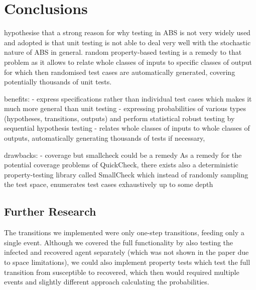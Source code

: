 \section{Conclusions}
\label{sec:conclusions}
hypothesise that a strong reason for why testing in ABS is not very widely used and adopted is that unit testing is not able to deal very well with the stochastic nature of ABS in general. random property-based testing is a remedy to that problem as it allows to relate whole classes of inputs to specific classes of output for which then randomised test cases are automatically generated, covering potentially thousands of unit tests.

benefits:
- express specifications rather than individual test cases which makes it much more general than unit testing
- expressing probabilities of various types (hypotheses, transitions, outputs) and perform statistical robust testing by sequential hypothesis testing
- relates whole classes of inputs to whole classes of outputs, automatically generating thousands of tests if necessary, 

drawbacks:
- coverage but smallcheck could be a remedy
As a remedy for the potential coverage problems of QuickCheck, there exists also a deterministic property-testing library called SmallCheck \cite{runciman_smallcheck_2008} which instead of randomly sampling the test space, enumerates test cases exhaustively up to some depth

\subsection{Further Research}
The transitions we implemented were only one-step transitions, feeding only a single event. Although we covered the full functionality by also testing the infected and recovered agent separately (which was not shown in the paper due to space limitations), we could also implement property tests which test the full transition from susceptible to recovered, which then would required multiple events and slightly different approach calculating the probabilities.